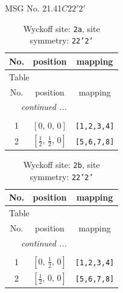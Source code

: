 \documentclass[fleqn,8pt]{jsarticle}
\begin{document}
\setcounter{MaxMatrixCols}{32}

\renewcommand{\tablename}{Table~}
\renewcommand{\figurename}{Figure~}
\begin{center}
\LARGE
MSG No. 21.41\quad$C22'2'$
\end{center}
\renewcommand{\arraystretch}{1.2}
\begin{longtable}{ccc}
\caption{Wyckoff site: {\tt 2a}, site symmetry: {\tt 22'2'}}
 \\
 \hline \hline
No. & position & mapping \\ \hline \endfirsthead

\multicolumn{2}{l}{\tablename\ \thetable{}} \\
 \hline \hline
No. & position & mapping \\ \hline \endhead

 \hline \hline
\multicolumn{2}{r}{\footnotesize\it continued ...} \\ \endfoot

 \hline \hline
\multicolumn{2}{r}{} \\ \endlastfoot

1 & $\left[ 0,\, 0,\, 0 \right]$ & {\tt [1,2,3,4]} \\ \hline
2 & $\left[ \frac{1}{2},\, \frac{1}{2},\, 0 \right]$ & {\tt [5,6,7,8]} \\
\end{longtable}
\renewcommand{\arraystretch}{1.2}
\begin{longtable}{ccc}
\caption{Wyckoff site: {\tt 2b}, site symmetry: {\tt 22'2'}}
 \\
 \hline \hline
No. & position & mapping \\ \hline \endfirsthead

\multicolumn{2}{l}{\tablename\ \thetable{}} \\
 \hline \hline
No. & position & mapping \\ \hline \endhead

 \hline \hline
\multicolumn{2}{r}{\footnotesize\it continued ...} \\ \endfoot

 \hline \hline
\multicolumn{2}{r}{} \\ \endlastfoot

1 & $\left[ 0,\, \frac{1}{2},\, 0 \right]$ & {\tt [1,2,3,4]} \\ \hline
2 & $\left[ \frac{1}{2},\, 0,\, 0 \right]$ & {\tt [5,6,7,8]} \\
\end{longtable}
\renewcommand{\arraystretch}{1.2}
\end{document}
